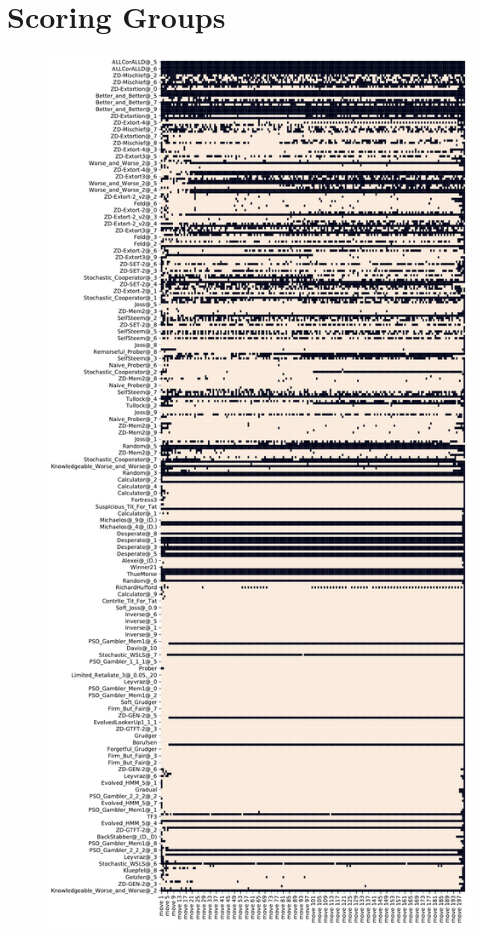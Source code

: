 \section{Scoring Groups}

\begin{figure}[ht]
    \centering
    \begin{minipage}{0.48\textwidth}
        \centering
        \includegraphics[width=1.0\textwidth, center]{./img/descriptive/sequence_plot_score_pt1.pdf}

\end{minipage}
\end{figure}

